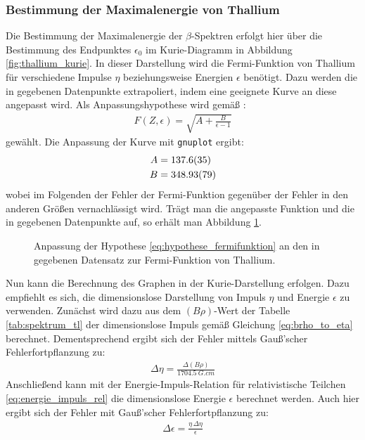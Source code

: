 \documentclass[11pt, a4paper]{article}
\numberwithin{equation}{section}
\begin{document}
\subsubsection{Bestimmung der Maximalenergie von Thallium}
\label{sssec:kurie_thallium}
Die Bestimmung der Maximalenergie der $\beta$-Spektren erfolgt hier über die Bestimmung des Endpunktes $\epsilon_0$ im Kurie-Diagramm in Abbildung \ref{fig:thallium_kurie}.
In dieser Darstellung wird die Fermi-Funktion von Thallium für verschiedene Impulse $\eta$ beziehungsweise Energien $\epsilon$ benötigt.
Dazu werden die in \cite{anleitung} gegebenen Datenpunkte extrapoliert, indem eine geeignete Kurve an diese angepasst wird.
Als Anpassungshypothese wird gemäß \cite{fermi_function}:
\begin{align}
	F(Z, \epsilon) = \sqrt{A + \frac{B}{\epsilon - 1}}
	\label{eq:hypothese_fermifunktion}
\end{align}
gewählt.
Die Anpassung der Kurve mit \texttt{gnuplot} ergibt:
\begin{align*}
	A &= \num{137.6 +- 3.5} \\
	B &= \num{348.93 +- 0.79}
\end{align*}
wobei im Folgenden der Fehler der Fermi-Funktion gegenüber der Fehler in den anderen Größen vernachlässigt wird.
Trägt man die angepasste Funktion und die in \cite{anleitung} gegebenen Datenpunkte auf, so erhält man Abbildung \ref{fig:fermi_tl}.
\begin{figure}[h]
	\centering
	
	\caption{Anpassung der Hypothese \eqref{eq:hypothese_fermifunktion} an den in \cite{anleitung} gegebenen Datensatz zur Fermi-Funktion von Thallium.}
	\label{fig:fermi_tl}
\end{figure}
Nun kann die Berechnung des Graphen in der Kurie-Darstellung erfolgen.
Dazu empfiehlt es sich, die dimensionslose Darstellung von Impuls $\eta$ und Energie $\epsilon$ zu verwenden.
Zunächst wird dazu aus dem $(B \rho)$-Wert der Tabelle \ref{tab:spektrum_tl} der dimensionslose Impuls gemäß Gleichung \eqref{eq:brho_to_eta} berechnet.
Dementsprechend ergibt sich der Fehler mittels Gauß'scher Fehlerfortpflanzung zu:
\begin{align}
	\Delta \eta = \frac{\Delta (B \rho)}{\SI{1704.5}{G.cm}}
\end{align}
Anschließend kann mit der Energie-Impuls-Relation für relativistische Teilchen \eqref{eq:energie_impuls_rel} die dimensionslose Energie $\epsilon$ berechnet werden.
Auch hier ergibt sich der Fehler mit Gauß'scher Fehlerfortpflanzung zu:
\begin{align}
	\Delta \epsilon = \frac{\eta \, \Delta \eta}{\epsilon}
\end{align}
\end{document}

